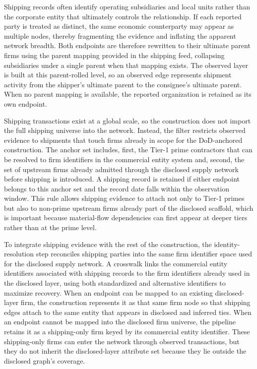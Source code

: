 Shipping records often identify operating subsidiaries and local units rather than the corporate entity that ultimately controls the relationship. If each reported party is treated as distinct, the same economic counterparty may appear as multiple nodes, thereby fragmenting the evidence and inflating the apparent network breadth. Both endpoints are therefore rewritten to their ultimate parent firms using the parent mapping provided in the shipping feed, collapsing subsidiaries under a single parent when that mapping exists. The observed layer is built at this parent-rolled level, so an observed edge represents shipment activity from the shipper's ultimate parent to the consignee's ultimate parent. When no parent mapping is available, the reported organization is retained as its own endpoint.

Shipping transactions exist at a global scale, so the construction does not import the full shipping universe into the network. Instead, the filter restricts observed evidence to shipments that touch firms already in scope for the DoD-anchored construction. The anchor set includes, first, the Tier-1 prime contractors that can be resolved to firm identifiers in the commercial entity system and, second, the set of upstream firms already admitted through the disclosed supply network before shipping is introduced. A shipping record is retained if either endpoint belongs to this anchor set and the record date falls within the observation window. This rule allows shipping evidence to attach not only to Tier-1 primes but also to non-prime upstream firms already part of the disclosed scaffold, which is important because material-flow dependencies can first appear at deeper tiers rather than at the prime level.

To integrate shipping evidence with the rest of the construction, the identity-resolution step reconciles shipping parties into the same firm identifier space used for the disclosed supply network. A crosswalk links the commercial entity identifiers associated with shipping records to the firm identifiers already used in the disclosed layer, using both standardized and alternative identifiers to maximize recovery. When an endpoint can be mapped to an existing disclosed-layer firm, the construction represents it as that same firm node so that shipping edges attach to the same entity that appears in disclosed and inferred ties. When an endpoint cannot be mapped into the disclosed firm universe, the pipeline retains it as a shipping-only firm keyed by its commercial entity identifier. These shipping-only firms can enter the network through observed transactions, but they do not inherit the disclosed-layer attribute set because they lie outside the disclosed graph's coverage.


